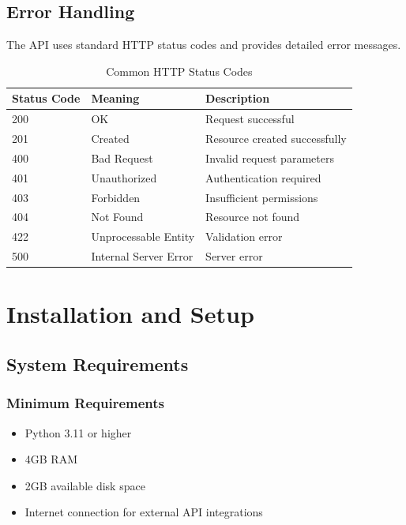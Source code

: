 \documentclass[12pt,a4paper]{report}
\begin{document}
\section{Error Handling}

The API uses standard HTTP status codes and provides detailed error messages.

\begin{table}[H]
\centering
\caption{Common HTTP Status Codes}
\label{tab:http-codes}
\begin{tabular}{@{}lll@{}}
\toprule
Status Code & Meaning & Description \\
\midrule
200 & OK & Request successful \\
201 & Created & Resource created successfully \\
400 & Bad Request & Invalid request parameters \\
401 & Unauthorized & Authentication required \\
403 & Forbidden & Insufficient permissions \\
404 & Not Found & Resource not found \\
422 & Unprocessable Entity & Validation error \\
500 & Internal Server Error & Server error \\
\bottomrule
\end{tabular}
\end{table}

\chapter{Installation and Setup}

\section{System Requirements}

\subsection{Minimum Requirements}
\begin{itemize}
    \item Python 3.11 or higher
    \item 4GB RAM
    \item 2GB available disk space
    \item Internet connection for external API integrations
\end{itemize}
\end{document}
